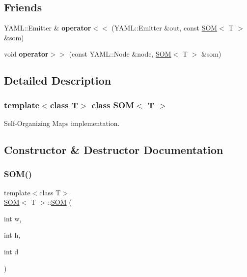\subsection*{Friends}
\begin{DoxyCompactItemize}
\item 
\mbox{\label{class_s_o_m_a16061bd717ac865e42d9fb288945b81a}} 
Y\+A\+M\+L\+::\+Emitter \& {\bfseries operator$<$$<$} (Y\+A\+M\+L\+::\+Emitter \&out, const \mbox{\hyperlink{class_s_o_m}{S\+OM}}$<$ T $>$ \&som)
\item 
\mbox{\label{class_s_o_m_adf2105b08320a0f005bbe1b55c91712a}} 
void {\bfseries operator$>$$>$} (const Y\+A\+M\+L\+::\+Node \&node, \mbox{\hyperlink{class_s_o_m}{S\+OM}}$<$ T $>$ \&som)
\end{DoxyCompactItemize}


\subsection{Detailed Description}
\subsubsection*{template$<$class T$>$\newline
class S\+O\+M$<$ T $>$}

Self-\/\+Organizing Maps implementation. 



\subsection{Constructor \& Destructor Documentation}
\mbox{\label{class_s_o_m_ae68da19aade22031ef375a4cc6c6cec4}} 
\subsubsection{\texorpdfstring{S\+O\+M()}{SOM()}\hspace{0.1cm}{\footnotesize\ttfamily [1/2]}}
{\footnotesize\ttfamily template$<$class T$>$ \\
\mbox{\hyperlink{class_s_o_m}{S\+OM}}$<$ T $>$\+::\mbox{\hyperlink{class_s_o_m}{S\+OM}} (\begin{DoxyParamCaption}\item[{int}]{w,  }\item[{int}]{h,  }\item[{int}]{d }\end{DoxyParamCaption})\hspace{0.3cm}{\ttfamily [inline]}}



